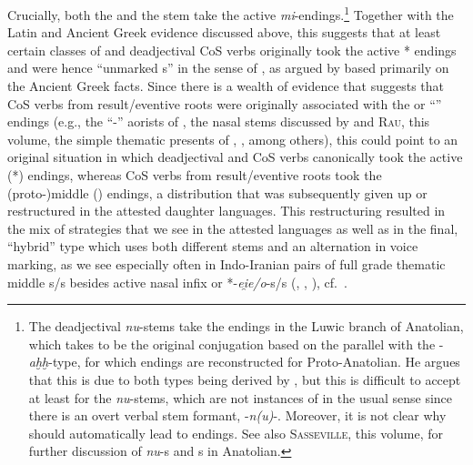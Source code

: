 \documentclass[output=paper,colorlinks,citecolor=brown]{langscibook}
\begin{document}
Crucially, both the  and the  stem take the active   \textit{mi}-endings.\footnote{The deadjectival   \textit{nu}-stems  take the  endings in the Luwic branch of Anatolian, which \citet[486]{Sasseville2021} takes to be the original conjugation based on the parallel with the  -\textit{aḫḫ}-type,  for which  endings are reconstructed for Proto-Anatolian. He argues that this is due to both types being derived by , but this is difficult to accept at least for the  \textit{nu}-stems, which are not instances of  in the usual sense since there is an overt verbal stem formant, -\textit{n(u)}-.  Moreover, it is not clear why  should automatically lead to  endings. See also \textsc{Sasseville}, this volume, for further discussion of \textit{nu}-s and s in Anatolian.} Together with the Latin and Ancient Greek evidence discussed above, this suggests that at least certain classes of  and  deadjectival  CoS  verbs originally took the active * endings and were hence ``unmarked s'' in the sense of \citet{Schafer2008}, as argued by \citet{Grestenberger2023} based primarily on the Ancient Greek facts. Since there is a wealth of evidence that suggests that  CoS verbs from result/eventive roots were originally associated with the  or ``'' endings (e.g., the ``-'' aorists of \citealt{Jasanoff2003}, the  nasal stems discussed by \citealt{Gorbachov2007} and \textsc{Rau}, this volume, the simple thematic presents  of \citealt{Rau2013}, \citeyear{Rau2016}, among others), this could point to an original situation in which deadjectival   and CoS  verbs canonically took the active (*) endings, whereas CoS  verbs from result/eventive roots took the (proto-)middle () endings, a distribution that was subsequently given up or restructured in the attested daughter languages. This restructuring resulted in the mix of strategies that we see in the attested languages as well as in the final, ``hybrid'' type which uses both different stems and an alternation in voice marking, as we see especially often in Indo-Iranian pairs of full grade thematic middle s/s besides active nasal infix or *-\textit{ei̯e/o}-s/s  (\citealt{Rau2009}, \citeyear{Rau2013}, \citeyear{Rau2016}), cf.\ .
\end{document}
